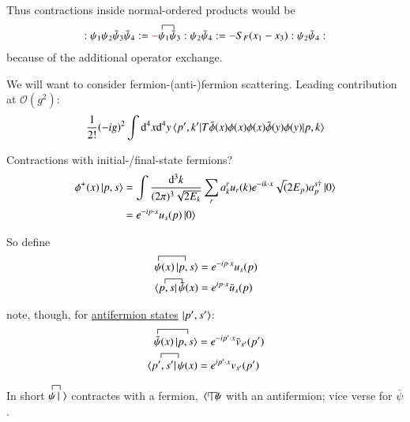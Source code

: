 Thus contractions inside normal-ordered products would be
\begin{align*}
	:\psi_1 \psi_2 \bar{\psi}_3 \bar{\psi}_4:= \textcolor{red}{-} \contraction{}{\psi}{_1}{\bar{\psi}}\psi_1\bar{\psi}_3 :\psi_2 \bar{\psi}_4: = \textcolor{red}{-} S_F(x_1 - x_3) :\psi_2 \bar{\psi}_4:
\end{align*}
because of the additional operator exchange.

We will want to consider fermion-(anti-)fermion scattering. Leading contribution at $\mathcal{O}(g^2)$:
\begin{align*}
	\frac{1}{2!} (-ig)^2 \int \dd^4 x \dd^4 y \braket{p', k' |T\bar{\phi}(x) \phi(x) \phi(x) \bar{\phi}(y)\phi(y)|p,k}
\end{align*}

Contractions with initial-/final-state fermions?
\begin{align*}
	\phi^+(x) \ket{p,s} &= \int \frac{\dd^3 k}{(2\pi)^3 \sqrt{2E_k}} \sum_r a^r_k u_r(k) e^{-ik\cdot x} \sqrt(2E_p) a^{s\dagger}_p \ket{0} \\
						&= e^{-ip\cdot x} u_s(p) \ket{0}	
\end{align*}

So define
\begin{align}
	\begin{split}
	\contraction{}{\psi}{(x)|}{p,s} \psi(x) \ket{p,s} &=  e^{-ip\cdot x} u_s(p) \\
	\contraction{\langle}{p,s}{|\;}{\bar\psi} \bra{p,s}\bar\psi(x)  &=  e^{ip\cdot x} \bar{u}_s(p)
	\end{split}
\end{align}

note, though, for \underline{antifermion states} $\ket{p', s'}$:
\begin{align}
	\begin{split}
	\contraction{}{\bar{\psi}}{(x)|}{p',s'} \bar{\psi}(x) \ket{p,s} &=  e^{-ip' \cdot x} \bar{v}_{s'}(p') \\
	\contraction{\langle}{p',s'}{|}{\psi} \bra{p',s'}\psi(x)  &=  e^{ip'\cdot x} v_{s'}(p')
	\end{split}
\end{align}

In short $\contraction{}{\psi}{|}{\;} \psi \ket{\;} $ contractes with a fermion, $\contraction{\langle}{\,\;}{|}{\psi} \bra{\;}\psi$ with an antifermion; vice verse for $\bar{\psi}$.


